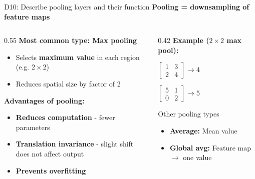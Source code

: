 \documentclass[aspectratio=169, 10pt]{beamer}
\begin{document}
\begin{frame}{D10: Describe pooling layers and their function}
    \textbf{Pooling = downsampling of feature maps}

    \vspace{0.2cm}
    \begin{columns}[T]
        \begin{column}{0.55\textwidth}
            \textbf{Most common type: Max pooling}
            \begin{itemize}
                \item Selects \textbf{maximum value} in each region (e.g. $2 \times 2$)
                \item Reduces spatial size by factor of 2
            \end{itemize}

            \vspace{0.2cm}
            \textbf{Advantages of pooling:}
            \begin{itemize}
                \item \textbf{Reduces computation} - fewer parameters
                \item \textbf{Translation invariance} - slight shift does not affect output
                \item \textbf{Prevents overfitting}
            \end{itemize}
        \end{column}
        \begin{column}{0.42\textwidth}
            \textbf{Example ($2 \times 2$ max pool):}
            \begin{center}
                $\begin{bmatrix} 1 & 3 \\ 2 & 4 \end{bmatrix} \rightarrow 4$

                \vspace{0.2cm}
                $\begin{bmatrix} 5 & 1 \\ 0 & 2 \end{bmatrix} \rightarrow 5$
            \end{center}

            \vspace{0.2cm}
            \begin{block}{\footnotesize Other pooling types}
                \footnotesize
                \begin{itemize}
                    \item \textbf{Average:} Mean value
                    \item \textbf{Global avg:} Feature map $\rightarrow$ one value
                \end{itemize}
            \end{block}
        \end{column}
    \end{columns}
\end{frame}
\end{document}
